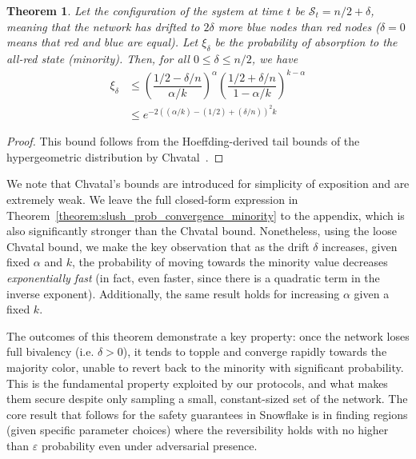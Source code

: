 \documentclass[letterpaper,twocolumn,10pt]{article}
\newtheorem{theorem}{Theorem}
\theoremstyle{definition}
\begin{document}
\begin{theorem}
Let the configuration of the system at time $t$ be $\mathcal{S}_t = n/2 + \delta$, meaning that the network has drifted to $2\delta$ more blue nodes than red nodes ($\delta = 0$ means that red and blue are equal). Let $\xi_\delta$ be the probability of absorption to the all-red state (minority). Then, for all $0 \leq \delta \leq n/2$, we have 
\begin{equation}
\begin{split}
    \xi_\delta &\leq \left(\dfrac{1/2 - \delta/n}{\alpha/k}\right)^{\alpha}\left(\dfrac{1/2 + \delta/n}{1- \alpha/k}\right)^{k-\alpha}\\
    &\leq e^{-2((\alpha/k) - (1/2) + (\delta/n))^2 k}
\end{split}
\end{equation}
\end{theorem}

\begin{proof}
This bound follows from the Hoeffding-derived tail bounds of the hypergeometric distribution by Chvatal~\cite{chvatal1979tail}. 
\end{proof}

We note that Chvatal's bounds are introduced for simplicity of exposition and are extremely weak.  
We leave the full closed-form expression in Theorem~\ref{theorem:slush_prob_convergence_minority} to the appendix, which is also significantly stronger than the Chvatal bound. 
Nonetheless, using the loose Chvatal bound, we make the key observation that as the drift $\delta$ increases, given fixed $\alpha$ and $k$, the probability of moving towards the minority value decreases \emph{exponentially fast} (in fact, even faster, since there is a quadratic term in the inverse exponent). Additionally, the same result holds for increasing $\alpha$ given a fixed $k$. 

The outcomes of this theorem demonstrate a key property: once the network loses full bivalency (i.e. $\delta > 0$), it tends to topple and converge rapidly towards the majority color, unable to revert back to the minority with significant probability. This is the fundamental property exploited by our protocols, and what makes them secure despite only sampling a small, constant-sized set of the network. The core result that follows for the safety guarantees in Snowflake is in finding regions (given specific parameter choices) where the reversibility holds with no higher than $\varepsilon$ probability even under adversarial presence. 
\end{document}
